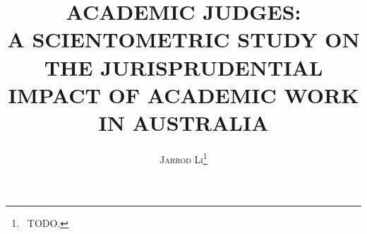 \documentclass[12pt]{article}
\begin{document}

\thispagestyle{plain}

\title{\vspace{-25mm}\large{\textbf{\uppercase{Academic Judges:\\A Scientometric Study on the Jurisprudential Impact of Academic Work in Australia}}}}
\date{}
\author{\textsc{Jarrod Li}\thanks{\;\, TODO.}}
\maketitle


\newpage

\thispagestyle{plain}


\tableofcontents
\newpage

\pagestyle{fancy}









\end{document}
